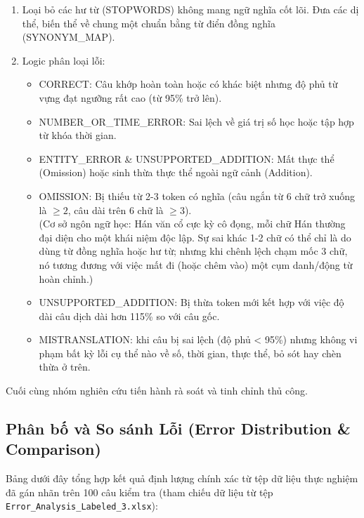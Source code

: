 \begin{enumerate}
\item Loại bỏ các hư từ (STOPWORDS) không mang ngữ nghĩa cốt lõi. Đưa các dị thể, biến thể về chung một chuẩn bằng từ điển đồng nghĩa (SYNONYM\_MAP).
\item Logic phân loại lỗi:

\begin{itemize}
\item CORRECT: Câu khớp hoàn toàn hoặc có khác biệt nhưng độ phủ từ vựng đạt ngưỡng rất cao (từ 95\% trở lên).

\item NUMBER\_OR\_TIME\_ERROR: Sai lệch về giá trị số học hoặc tập hợp từ khóa thời gian.

\item ENTITY\_ERROR & UNSUPPORTED\_ADDITION: Mất thực thể (Omission) hoặc sinh thừa thực thể ngoài ngữ cảnh (Addition).

\item OMISSION: Bị thiếu từ 2-3 token có nghĩa (câu ngắn từ 6 chữ trở xuống là $\geq 2$, câu dài trên 6 chữ là $\geq 3$).\\
(Cơ sở ngôn ngữ học: Hán văn cổ cực kỳ cô đọng, mỗi chữ Hán thường đại diện cho một khái niệm độc lập. Sự sai khác 1-2 chữ có thể chỉ là do dùng từ đồng nghĩa hoặc hư từ; nhưng khi chênh lệch chạm mốc 3 chữ, nó tương đương với việc mất đi (hoặc chêm vào) một cụm danh/động từ hoàn chỉnh.)

\item UNSUPPORTED\_ADDITION: Bị thừa token mới kết hợp với việc độ dài câu dịch dài hơn 115\% so với câu gốc.

\item MISTRANSLATION: khi câu bị sai lệch (độ phủ < 95\%) nhưng không vi phạm bất kỳ lỗi cụ thể nào về số, thời gian, thực thể, bỏ sót hay chèn thừa ở trên.
\end{itemize}

\end{enumerate}

Cuối cùng nhóm nghiên cứu tiến hành rà soát và tinh chỉnh thủ công.

\subsection{Phân bố và So sánh Lỗi (Error Distribution \& Comparison)}
Bảng dưới đây tổng hợp kết quả định lượng chính xác từ tệp dữ liệu thực nghiệm đã gán nhãn trên 100 câu kiểm tra (tham chiếu dữ liệu từ tệp \texttt{Error\_Analysis\_Labeled\_3.xlsx}):

